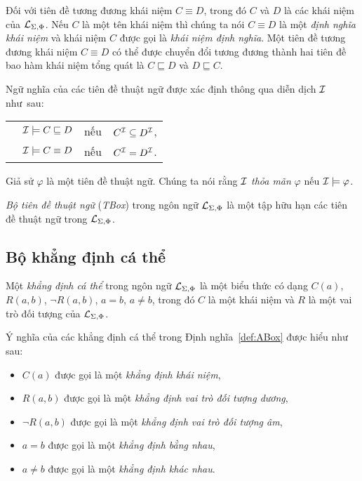 Đối với tiên đề tương đương khái niệm $C \equiv D$, trong đó $C$ và $D$ là các khái niệm của $\mathcal{L}_{\Sigma,\Phi}$. 
Nếu $C$ là một tên khái niệm thì chúng ta nói $C \equiv D$ là một {\em định nghĩa khái niệm} và khái niệm $C$ được gọi là {\em khái niệm định nghĩa}. 
Một tiên đề tương đương khái niệm $C \equiv D$ có thể được chuyển đổi tương đương thành hai tiên đề bao hàm khái niệm tổng quát là $C \sqsubseteq D$ và $D \sqsubseteq C$.

Ngữ nghĩa của các tiên đề thuật ngữ được xác định thông qua diễn dịch $\mathcal{I}$ như~sau:\\[1.5ex]
\begin{tabular}{c l c l}
	& $\mathcal{I} \models C \sqsubseteq D$ & nếu & $C^{\mathcal{I}} \subseteq D^{\mathcal{I}}$,\\[0.5ex]
	& $\mathcal{I} \models C \equiv D$ & nếu & $C^{\mathcal{I}} = D^{\mathcal{I}}$.
\end{tabular}

Giả sử $\varphi$ là một tiên đề thuật ngữ. Chúng ta nói rằng $\mathcal{I}$ {\em thỏa mãn} $\varphi$ nếu $\mathcal{I} \models \varphi$.

\begin{Definition}
\label{def:TBox}
	{\em Bộ tiên đề thuật ngữ} ({\em TBox}) trong ngôn ngữ $\mathcal{L}_{\Sigma,\Phi}$ là một tập hữu hạn các tiên đề thuật ngữ trong $\mathcal{L}_{\Sigma,\Phi}$.\myend
\end{Definition}

\subsection{Bộ khẳng định cá thể}
\label{sec:Chap1.ABox}

\begin{Definition}
\label{def:AssertionIndividual}
Một {\em khẳng định cá thể} trong ngôn ngữ $\mathcal{L}_{\Sigma,\Phi}$ là một biểu thức có dạng $C(a)$, $R(a,b)$, $\neg R(a,b)$, $a=b$, $a \not=b$, trong đó $C$ là một khái niệm và $R$ là một vai trò đối tượng của $\mathcal{L}_{\Sigma,\Phi}$.\myend
\end{Definition}

Ý nghĩa của các khẳng định cá thể trong Định nghĩa~\ref{def:ABox} được hiểu như sau:
\begin{itemize}
  \item $C(a)$ được gọi là một {\em khẳng định khái niệm},
  \item $R(a,b)$ được gọi là một {\em khẳng định vai trò đối tượng dương},
  \item $\neg R(a,b)$ được gọi là một {\em khẳng định vai trò đối tượng âm},
  \item $a=b$ được gọi là một {\em khẳng định bằng nhau},
  \item $a \not=b$ được gọi là một {\em khẳng định khác nhau}.        
\end{itemize}

